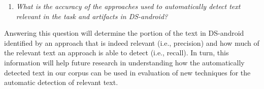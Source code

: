 \begin{enumerate}[label={},leftmargin=0.7cm]
\item \textit{What is the accuracy of the approaches used to automatically detect text relevant in the task and artifacts in \acs{DS-android}?} 

\end{enumerate}


Answering this question will determine the portion of the text in \acs{DS-android} identified by an approach that 
is indeed relevant (i.e., precision) and how much 
of the relevant text an approach is able to detect (i.e., recall).
In turn, this information will help future research in understanding
how the automatically detected text in our corpus can be used in evaluation of new techniques for the automatic detection of relevant text. 

